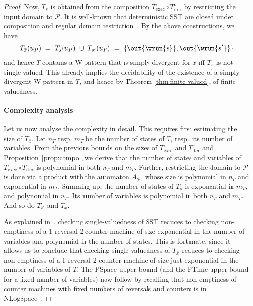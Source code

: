 \documentclass{article}
\begin{document}
\begin{proof}
    Now, $T_s$ is obtained from the  composition
    $T_{\mathrm{exec}} \circ T_{\mathrm{iter}}^s$ by 
    restricting the input domain to $\mathcal{P}$.
    It is well-known that
    deterministic SST are closed under  composition 
    and regular domain restriction~\cite{DBLP:conf/fsttcs/AlurC10}. 
    By the above constructions, we have
    \[
      T_{\bar x}(u_P) 
      ~=~ T_s(u_P) ~\cup~ T_{s'}(u_P)
      ~=~ \{\out{\wrun{s}},\out{\wrun{s'}}\}
    \]
    and hence $T$ contains a W-pattern that is 
    simply divergent for $\bar x$ iff 
    $T_{\bar x}$ is not single-valued.
    This already implies the decidability of the
    existence of a simply divergent W-pattern in $T$,
    and hence by Theorem \ref{thm:finite-valued},
    of finite valuedness.

    \paragraph{Complexity analysis} 
    Let us now analyse the complexity  in detail.    
    This requires first estimating the size of $T_{\bar x}$. Let $n_T$ resp. $m_T$ be the number of states of $T$,
    resp.~its number of variables. 
   From the previous bounds on the sizes of
    $T_{\mathrm{exec}}$ and $T^s_{\mathrm{iter}}$ and Proposition~\ref{prop:compo}, 
    we derive that the number of states and variables of 
    $T_{\mathrm{exec}}\circ T^s_{\mathrm{iter}}$ is polynomial 
    in both $n_T$ and $m_T$.
    Further, restricting the domain to $\mathcal{P}$ is done 
    via a product with the automaton $A_\mathcal{P}$,
    whose size is polynomial in $n_T$ 
    and exponential in $m_T$.
    Summing up, the number of states of $T_s$ is exponential 
    in $m_T$, and polynomial in $n_T$.
    Its number of variables is polynomial in both $n_T$ and $m_T$.
    And so do $T_{s'}$ and $T_{\bar x}$. 
    
    As explained in~\cite{DBLP:conf/icalp/AlurD11}, 
    checking single-valuedness of SST reduces to 
    checking non-emptiness of a 1-reversal 2-counter 
    machine of size exponential in the number of variables 
    and polynomial in the number of states. 
    This is  fortunate, since it allows us
    to conclude that checking single-valuedness of 
    $T_{\bar x}$ reduces to checking non-emptiness of 
    a 1-reversal 2-counter machine of size just exponential 
    in the number of variables of $T$. 
    The {\upshape\sc PSpace} upper bound (and the {\upshape\sc PTime} upper
    bound for a fixed number of variables) now follow by recalling
    that non-emptiness of counter machines with fixed numbers of reversals and counters is
    in {\upshape\sc NLogSpace}~\cite{DBLP:journals/jcss/GurariI81}. 



\end{proof}
\end{document}
